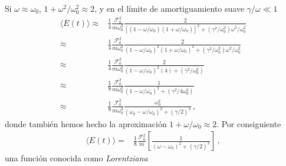 \begin{frame}
Si $\omega\approx\omega_0$, $1+\omega^2/\omega_0^2\approx 2$, y en el límite de amortiguamiento suave $\gamma/\omega\ll1$
\begin{align*}
 \langle E(t)\rangle\approx&\frac{1}{4}\frac{\mathcal{F}_0^2}{m\omega_0^2}\frac{2}{[(1-{\omega}/{\omega_0})(1+{\omega}/{\omega_0})]^2+(\gamma^2/\omega_0^2)\omega^2/\omega_0^2}\nonumber\\
 \approx&\frac{1}{4}\frac{\mathcal{F}_0^2}{m\omega_0^2}\frac{2}{(1-{\omega}/{\omega_0})^2(1+{\omega}/{\omega_0})^2+(\gamma^2/\omega_0^2)\omega^2/\omega_0^2}\nonumber\\
\approx&\frac{1}{4}\frac{\mathcal{F}_0^2}{m\omega_0^2}\frac{2}{(1-{\omega}/{\omega_0})^2(4)+(\gamma^2/\omega_0^2)}\nonumber\\
\approx&\frac{1}{8}\frac{\mathcal{F}_0^2}{m\omega_0^2}\frac{1}{(1-{\omega}/{\omega_0})^2+(\gamma^2/4\omega_0^2)}\nonumber\\
\approx&\frac{1}{8}\frac{\mathcal{F}_0^2}{m\omega_0^2}\frac{\omega_0^2}{(\omega_0-{\omega}/{\omega_0})^2+(\gamma/2)^2}\,,
\end{align*}
donde también hemos hecho la aproximación $1+\omega/\omega_0\approx 2$. Por consiguiente 
\begin{align*}
   \langle E(t)\rangle=&\frac{1}{8}\frac{\mathcal{F}_0^2}{m}
   \left[\frac{1}{(\omega-\omega_0)^2+(\gamma/2)^2}\right]\,,
\end{align*}
una función conocida como \emph{Lorentziana}
\end{frame}

